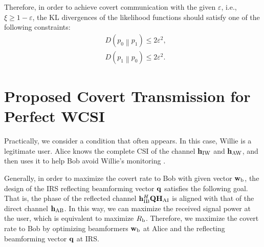 \documentclass[10pt,journal,letterpaper,twocolumn,twoside]{IEEEtran} %
\begin{document}
Therefore,   in order to  achieve  covert communication with the given $\varepsilon$, i.e., $ \xi    \ge 1 - \varepsilon $, the KL divergences  of the likelihood functions should satisfy  one of the following constraints:
\begin{subequations}\label{Dp0p1}
\begin{align}
&D\left( {{p_0}\left\| {{p_1}} \right.} \right) \le 2{\varepsilon ^2},\\
&D\left( {{p_1}\left\| {{p_0}} \right.} \right) \le 2{\varepsilon ^2}.
\end{align}
\end{subequations}







\section{Proposed  Covert Transmission for Perfect WCSI}
Practically,
 we consider a condition that often appears. In this case,   Willie is a legitimate user.
 Alice knows the complete CSI of the channel ${{\bf{h}}_{\rm{IW}}}$ and ${{\bf{h}}_{\rm{AW}}}$,
  and then uses it to help Bob avoid Willie's monitoring \cite{Bash13,Forouzesh20Communication}.


Generally, in order to maximize the covert  rate to Bob  with given  vector
${{\bf{w}}_{\rm{b}}}$, the design of the IRS reflecting beamforming vector  ${\bf{q}}$
satisfies the following goal. That is, the phase of the reflected channel ${{\bf{h}}_{{\rm{IB}}}^H{\bf{Q}}{{\bf{H}}_{{\rm{AI}}}}}$ is aligned with that of the direct channel ${{{\bf{h}}_{{\rm{AB}}}}}$. In this way, we can maximize  the received signal power at
the user, which is equivalent to maximize ${R_{\rm{b}}}$.
Therefore,  we  maximize   the covert  rate to Bob by optimizing beamformers ${{\bf{w}}_{\rm{b}}}$ at Alice and the reflecting beamforming vector ${\bf{q}}$ at IRS.
\end{document}
